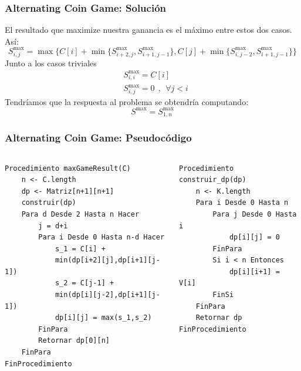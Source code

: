 \documentclass[10pt]{beamer}
\begin{document}
    \begin{frame}
        \frametitle{Alternating Coin Game: Solución}
        El resultado que maximize nuestra ganancia es el máximo entre estos dos casos. Así:
        \begin{equation*}
            S_{i,j}^{\max} = \max\{ C[i] + \min\{S_{i+2,j}^{\max},S_{i+1,j-1}^{\max}\}, C[j] + \min\{S_{i,j-2}^{\max},S_{i+1,j-1}^{\max}\} \}
        \end{equation*}
        Junto a los casos triviales
        \begin{align*}
            &S_{i,i}^{\max} = C[i] \\
            &S_{i,j}^{\max} = 0 \ \ , \ \  \forall j < i
        \end{align*}
        Tendríamos que la respuesta al problema se obtendría computando:
        \begin{equation*}
            S^{\max} = S_{1,n}^{\max}
        \end{equation*}
    \end{frame}

    \begin{frame}[fragile]
        \frametitle{Alternating Coin Game: Pseudocódigo}
        \begin{columns}
            \begin{column}{0.6\textwidth}
                \begin{lstlisting}[basicstyle=\ttfamily\scriptsize]
Procedimiento maxGameResult(C)
    n <- C.length
    dp <- Matriz[n+1][n+1]
    construir(dp)
    Para d Desde 2 Hasta n Hacer
        j = d+i
        Para i Desde 0 Hasta n-d Hacer
            s_1 = C[i] + 
            min(dp[i+2][j],dp[i+1][j-1])
            s_2 = C[j-1] + 
            min(dp[i][j-2],dp[i+1][j-1])
            dp[i][j] = max(s_1,s_2)
        FinPara
        Retornar dp[0][n]
    FinPara
FinProcedimiento
                \end{lstlisting}
            \end{column}
            \begin{column}{0.5\textwidth}
                \begin{lstlisting}[basicstyle=\ttfamily\scriptsize]
Procedimiento construir_dp(dp)
    n <- K.length
    Para i Desde 0 Hasta n
        Para j Desde 0 Hasta i
            dp[i][j] = 0
        FinPara
        Si i < n Entonces
            dp[i][i+1] = V[i]
        FinSi
    FinPara
    Retornar dp 
FinProcedimiento    
                \end{lstlisting}
            \end{column}
        \end{columns}
    \end{frame}
\end{document}
